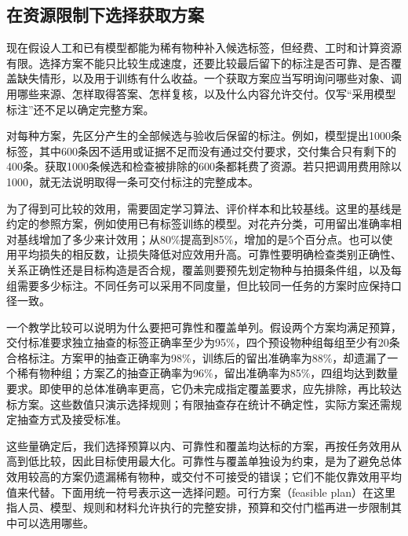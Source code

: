 \subsection{在资源限制下选择获取方案}
\label{sec:knowledge-acquisition-plan-selection}

现在假设人工和已有模型都能为稀有物种补入候选标签，但经费、工时和计算资源有限。选择方案不能只比较生成速度，还要比较最后留下的标注是否可靠、是否覆盖缺失情形，以及用于训练有什么收益。一个获取方案应当写明询问哪些对象、调用哪些来源、怎样取得答案、怎样复核，以及什么内容允许交付。仅写“采用模型标注”还不足以确定完整方案。

对每种方案，先区分产生的全部候选与验收后保留的标注。例如，模型提出1000条标签，其中600条因不适用或证据不足而没有通过交付要求，交付集合只有剩下的400条。获取1000条候选和检查被排除的600条都耗费了资源。若只把调用费用除以1000，就无法说明取得一条可交付标注的完整成本。

为了得到可比较的效用，需要固定学习算法、评价样本和比较基线。这里的基线是约定的参照方案，例如使用已有标签训练的模型。对花卉分类，可用留出准确率相对基线增加了多少来计效用；从80\%提高到85\%，增加的是5个百分点。也可以使用平均损失的相反数，让损失降低对应效用升高。可靠性要明确检查类别正确性、关系正确性还是目标构造是否合规，覆盖则要预先划定物种与拍摄条件组，以及每组需要多少标注。不同任务可以采用不同度量，但比较同一任务的方案时应保持口径一致。

一个教学比较可以说明为什么要把可靠性和覆盖单列。假设两个方案均满足预算，交付标准要求独立抽查的标签正确率至少为95\%，四个预设物种组每组至少有20条合格标注。方案甲的抽查正确率为98\%，训练后的留出准确率为88\%，却遗漏了一个稀有物种组；方案乙的抽查正确率为96\%，留出准确率为85\%，四组均达到数量要求。即使甲的总体准确率更高，它仍未完成指定覆盖要求，应先排除，再比较达标方案。这些数值只演示选择规则；有限抽查存在统计不确定性，实际方案还需规定抽查方式及接受标准。

这些量确定后，我们选择预算以内、可靠性和覆盖均达标的方案，再按任务效用从高到低比较，因此目标使用最大化。可靠性与覆盖单独设为约束，是为了避免总体效用较高的方案仍遗漏稀有物种，或交付不可接受的错误；它们不能仅靠效用平均值来代替。下面用统一符号表示这一选择问题。可行方案（feasible plan）在这里指人员、模型、规则和材料允许执行的完整安排，预算和交付门槛再进一步限制其中可以选用哪些。

